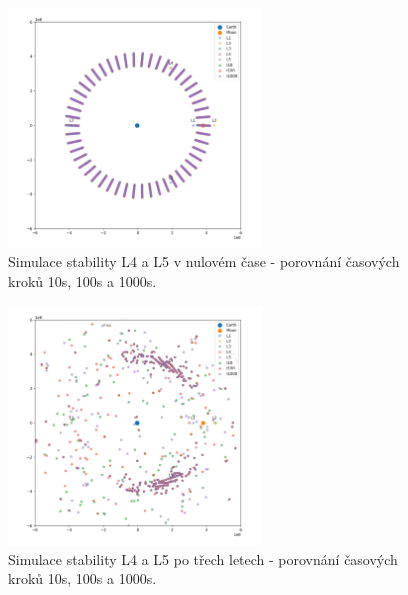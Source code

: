 \documentclass[a4paper,11pt]{article}
\begin{document}
\begin{figure}[h!]
    \centering
    \includegraphics[width=0.6\textwidth]{lagrange-25ring-comp-t0.png}

    \caption{Simulace stability L4 a L5 v nulovém čase - porovnání časových kroků 10s, 100s a 1000s.}
    \label{fig:lagrange-25ring-comp-t0}
\end{figure}

\begin{figure}[h!]
    \centering
    \includegraphics[width=0.6\textwidth]{lagrange-25ring-comp-t3yr.png}

    \caption{Simulace stability L4 a L5 po třech letech - porovnání časových kroků 10s, 100s a 1000s.}
    \label{fig:lagrange-25ring-comp-t3yr}
\end{figure}
\end{document}
